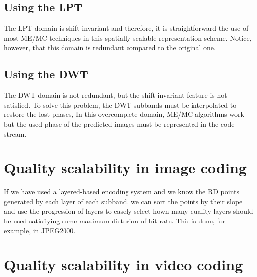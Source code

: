 \subsection{Using the LPT}

The LPT domain is shift invariant and therefore, it is straightforward
the use of most ME/MC techniques in this spatially scalable
representation scheme. Notice, however, that this domain is redundant
compared to the original one.

\subsection{Using the DWT}

The DWT domain is not redundant, but the shift invariant feature is
not satisfied. To solve this problem, the DWT subbands must be
interpolated to restore the lost phases, In this overcomplete domain,
ME/MC algorithms work but the used phase of the predicted images must
be represented in the code-stream.

\section{Quality scalability in image coding}

If we have used a layered-based encoding system and we know the RD
points generated by each layer of each subband, we can sort the points
by their slope and use the progression of layers to easely select hown
many quality layers should be used satisfiying some maximum distorion
of bit-rate. This is done, for example, in JPEG2000.

\section{Quality scalability in video coding}

